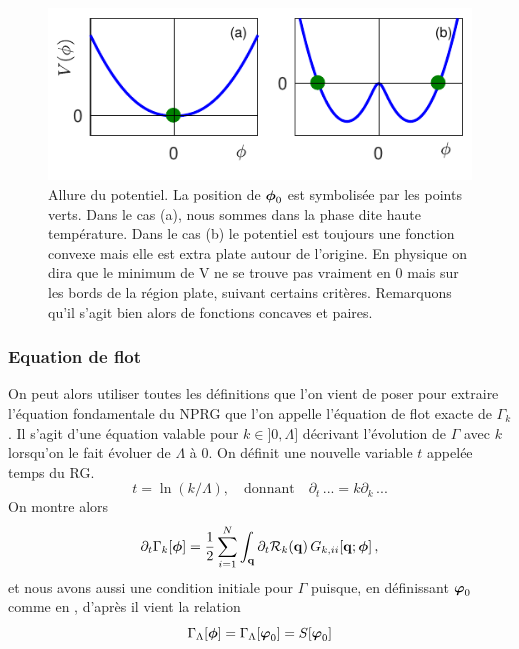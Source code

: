 \documentclass[10pt]{article}
\begin{document}
\begin{multicols}{2}
{\begin{figure}[H]
\begin{center}
\includegraphics[width=0.95\columnwidth]{CourbePot2.pdf}
\caption{Allure du potentiel. La position de $\boldsymbol{ \phi}_0$ est symbolisée par les points verts. Dans le cas (a), nous sommes dans la phase dite haute température. Dans le cas (b) le potentiel est toujours une fonction convexe mais elle est extra plate autour de l'origine. En physique on dira que le minimum de V ne se trouve pas vraiment en $0$ mais sur les bords de la région plate, suivant certains critères. Remarquons qu'il s'agit bien alors de fonctions concaves et paires.}
\end{center}
\end{figure}
\vspace*{-11pt}

}

\subsubsection{Equation de flot}

On peut alors utiliser toutes les définitions que l'on vient de poser pour extraire l'équation fondamentale du NPRG que l'on appelle l'équation de flot exacte de $\Gamma_k$. Il s'agit d'une équation valable pour $k \in ]0, \Lambda]$ décrivant l'évolution de $\Gamma$ avec $k$ lorsqu'on le fait évoluer de $\Lambda$ à $0$. On définit une nouvelle variable $t$ appelée temps du RG.
\begin{equation}
	t = \ln(k/\Lambda), \quad \text{donnant} \quad \partial_t \, ... = k\partial_k \, ...
\end{equation}
On montre alors
\begin{equation}
\partial_t \Gamma_{k}	[\boldsymbol{ \phi}] = \frac{1}{2} \sum\limits_{i=1}^{N} \int_{\bf q} \partial_t \mathcal{R}_k({\bf q}) \, G_{k, ii}[{\bf q}; \boldsymbol{ \phi}] \, ,
	\label{eq:flot}
\end{equation}
et nous avons aussi une condition initiale pour $\Gamma$ puisque, en définissant $\boldsymbol{ \varphi}_0$ comme en , d'après  il vient la relation
\begin{equation}
	\Gamma_\Lambda [\boldsymbol{ \phi}] = \Gamma_\Lambda 	[\boldsymbol{ \varphi}_0] = S[\boldsymbol{ \varphi}_0]
\end{equation}



\end{multicols}
\end{document}
